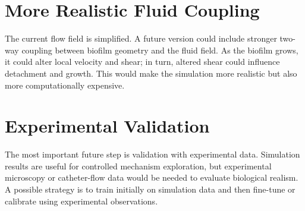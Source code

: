 \documentclass[12pt,a4paper,oneside]{report}
\begin{document}
\section{More Realistic Fluid Coupling}
The current flow field is simplified. A future version could include stronger two-way coupling between biofilm geometry and the fluid field. As the biofilm grows, it could alter local velocity and shear; in turn, altered shear could influence detachment and growth. This would make the simulation more realistic but also more computationally expensive.

\section{Experimental Validation}
The most important future step is validation with experimental data. Simulation results are useful for controlled mechanism exploration, but experimental microscopy or catheter-flow data would be needed to evaluate biological realism. A possible strategy is to train initially on simulation data and then fine-tune or calibrate using experimental observations.
\end{document}
